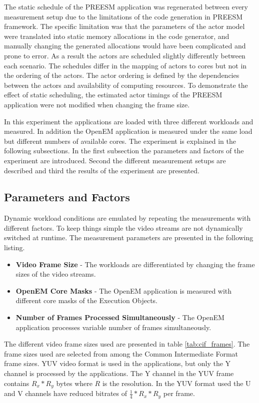 The static schedule of the PREESM application was regenerated between every measurement setup due to the limitations of the code generation in PREESM framework. The specific limitation was that the parameters of the actor model were translated into static memory allocations in the code generator, and manually changing the generated allocations would have been complicated and prone to error. As a result the actors are scheduled slightly differently between each scenario. The schedules differ in the mapping of actors to cores but not in the ordering of the actors. The actor ordering is defined by the dependencies between the actors and availability of computing resources. To demonstrate the effect of static scheduling, the estimated actor timings of the PREESM application were not modified when changing the frame size. 

In this experiment the applications are loaded with three different workloads and measured. In addition the OpenEM application is measured under the same load but different numbers of available cores. The experiment is explained in the following subsections. In the first subsection the parameters and factors of the experiment are introduced. Second the different measurement setups are described and third the results of the experiment are presented.

\subsection{Parameters and Factors}
Dynamic workload conditions are emulated by repeating the measurements with different factors. To keep things simple the video streams are not dynamically switched at runtime. The measurement parameters are presented in the following listing.

\begin{itemize}
    \item \textbf{Video Frame Size} - The workloads are differentiated by changing the frame sizes of the video streams.
    \item \textbf{OpenEM Core Masks} - The OpenEM application is measured with different core masks of the Execution Objects.
    \item \textbf{Number of Frames Processed Simultaneously} - The OpenEM application processes variable number of frames simultaneously.
\end{itemize}

The different video frame sizes used are presented in table \ref{tab:cif_frames}. The frame sizes used are selected from among the Common Intermediate Format frame sizes.  YUV video format is used in the applications, but only the Y channel is processed by the applications. The Y channel in the YUV frame contains $R_{x} * R_{y}$ bytes where $R$ is the resolution. In the YUV format used the U and V channels have reduced bitrates of $\frac{1}{4} * R_{x} * R_{y}$ per frame.

